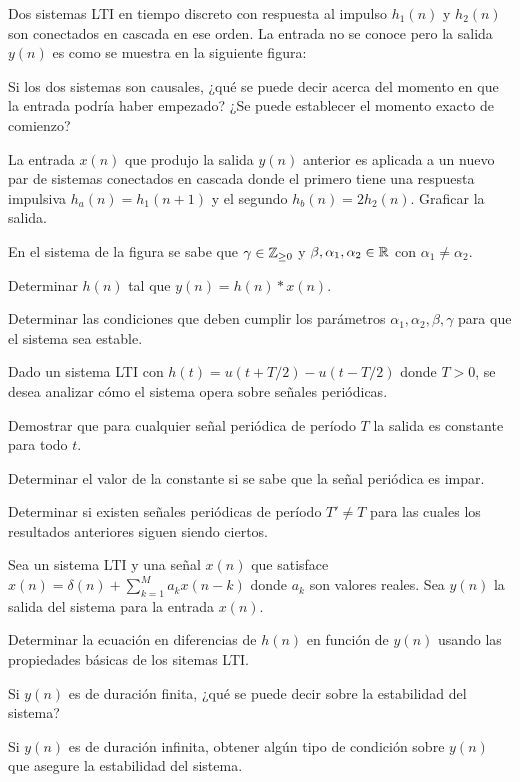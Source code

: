 \begin{ejercicio}
    Dos sistemas LTI en tiempo discreto con respuesta al impulso $h_1(n)$ y $h_2(n)$ son conectados en cascada en ese orden. La entrada no se conoce pero la salida $y(n)$ es como se muestra en la siguiente figura:
    \begin{center}
        
    \end{center}
    
    \inciso Si los dos sistemas son causales, ¿qué se puede decir acerca del momento en que la entrada podría haber empezado? ¿Se puede establecer el momento exacto de comienzo?
    
    \inciso La entrada $x(n)$ que produjo la salida $y(n)$ anterior es aplicada a un nuevo par de sistemas conectados en cascada donde el primero tiene una respuesta impulsiva $h_a(n) = h_1(n + 1)$ y el segundo $h_b(n) = 2h_2(n)$. Graficar la salida.
\end{ejercicio}
    
\begin{ejercicio}
    En el sistema de la figura se sabe que $\gamma \in \mathbb{Z}_{\geq 0}$ y $\beta, \alpha_1, \alpha_2 \in \mathbb{R}$ con $\alpha_1 \neq \alpha_2$.
    \begin{center}
        
    \end{center}

    \inciso Determinar $h(n)$ tal que $y(n) = h(n) * x(n)$.

    \inciso Determinar las condiciones que deben cumplir los parámetros $\alpha_1, \alpha_2, \beta, \gamma$ para que el sistema sea estable.
\end{ejercicio}

\begin{ejercicio}
    Dado un sistema LTI con $h(t) = u(t + T/2) - u(t - T/2)$ donde $T>0$, se desea analizar cómo el sistema opera sobre señales periódicas.
    
    \inciso Demostrar que para cualquier señal periódica de período $T$ la salida es constante para todo $t$.

    \inciso Determinar el valor de la constante si se sabe que la señal periódica es impar.

    \inciso Determinar si existen señales periódicas de período $T'\neq T$ para las cuales los resultados anteriores siguen siendo ciertos.
\end{ejercicio}

\begin{ejercicio}
    Sea un sistema LTI y una señal $x(n)$ que satisface $x(n)=\delta(n) + \sum_{k=1}^M a_k x(n-k)$ donde $a_k$ son valores reales. Sea $y(n)$ la salida del sistema para la entrada $x(n)$.

    \inciso Determinar la ecuación en diferencias de $h(n)$ en función de $y(n)$ usando las propiedades básicas de los sitemas LTI.
    
    \inciso Si $y(n)$ es de duración finita, ¿qué se puede decir sobre la estabilidad del sistema?

    \inciso Si $y(n)$ es de duración infinita, obtener algún tipo de condición sobre $y(n)$ que asegure la estabilidad del sistema.
\end{ejercicio}
    
    
    